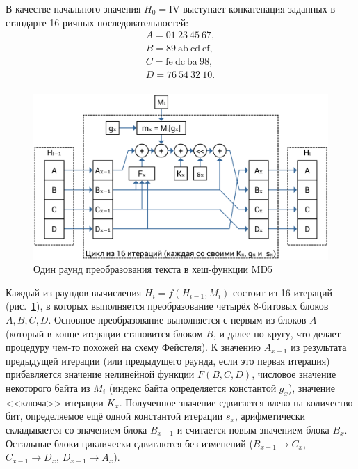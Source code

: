 В качестве начального значения $H_0 = \text{IV}$ выступает конкатенация заданных в стандарте 16-ричных последовательностей:
\[\begin{array}{l}
A = \text{01} ~ \text{23} ~ \text{45} ~ \text{67},\\
B = \text{89} ~ \text{ab} ~ \text{cd} ~ \text{ef},\\
C = \text{fe} ~ \text{dc} ~ \text{ba} ~ \text{98},\\
D = \text{76} ~ \text{54} ~ \text{32} ~ \text{10}.\\
\end{array}\]

\begin{figure}[htb]
    \centering
    \includegraphics[width=\textwidth]{pic/md5-round}
    \caption{Один раунд преобразования текста в хеш-функции MD5}
    \label{fig:md5-round}
\end{figure}

Каждый из раундов вычисления $H_i = f ( H_{i-1}, M_i )$ состоит из 16 итераций (рис.~\ref{fig:md5-round}), в которых выполняется преобразование четырёх 8-битовых блоков $A, B, C, D$. Основное преобразование выполняется с первым из блоков $A$ (который в конце итерации становится блоком $B$, и далее по кругу, что делает процедуру чем-то похожей на схему Фейстеля). К значению $A_{x-1}$ из результата предыдущей итерации (или предыдущего раунда, если это первая итерация) прибавляется значение нелинейной функции $F(B, C, D)$, числовое значение некоторого байта из $M_i$ (индекс байта определяется константой $g_x$), значение <<ключа>> итерации $K_x$. Полученное значение сдвигается влево на количество бит, определяемое ещё одной константой итерации $s_x$, арифметически складывается со значением блока $B_{x-1}$ и считается новым значением блока $B_x$. Остальные блоки циклически сдвигаются без изменений ($B_{x-1} \to C_x$, $C_{x-1} \to D_x$, $D_{x-1} \to A_x$).

